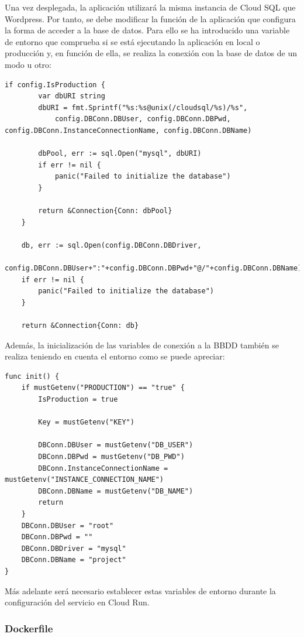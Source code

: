 Una vez desplegada, la aplicación utilizará la misma instancia de Cloud SQL que Wordpress. Por tanto, se debe modificar la función de la aplicación que configura la forma de acceder a la base de datos. Para ello se ha introducido una variable de entorno que comprueba si se está ejecutando la aplicación en local o producción y, en función de ella, se realiza la conexión con la base de datos de un modo u otro:

\begin{lstlisting}[caption= Conexi\'on a la BBDD en funci\'on del entorno de trabajo]
    if config.IsProduction {
		var dbURI string
		dbURI = fmt.Sprintf("%s:%s@unix(/cloudsql/%s)/%s",
			config.DBConn.DBUser, config.DBConn.DBPwd, config.DBConn.InstanceConnectionName, config.DBConn.DBName)

		dbPool, err := sql.Open("mysql", dbURI)
		if err != nil {
			panic("Failed to initialize the database")
		}

		return &Connection{Conn: dbPool}
	}

	db, err := sql.Open(config.DBConn.DBDriver,
		config.DBConn.DBUser+":"+config.DBConn.DBPwd+"@/"+config.DBConn.DBName)
	if err != nil {
		panic("Failed to initialize the database")
	}

	return &Connection{Conn: db}
\end{lstlisting}

Además, la inicialización de las variables de conexión a la BBDD también se realiza teniendo en cuenta el entorno como se puede apreciar: 

\begin{lstlisting}[caption= Inicializaci\'on de variables de conexi\'on a la BBDD]
func init() {
	if mustGetenv("PRODUCTION") == "true" {
		IsProduction = true

		Key = mustGetenv("KEY")

		DBConn.DBUser = mustGetenv("DB_USER")
		DBConn.DBPwd = mustGetenv("DB_PWD")
		DBConn.InstanceConnectionName = mustGetenv("INSTANCE_CONNECTION_NAME")
		DBConn.DBName = mustGetenv("DB_NAME")
		return
	}
	DBConn.DBUser = "root"
	DBConn.DBPwd = ""
	DBConn.DBDriver = "mysql"
	DBConn.DBName = "project"
}
\end{lstlisting}

Más adelante será necesario establecer estas variables de entorno durante la configuración del servicio en Cloud Run.

\subsubsection{Dockerfile}

